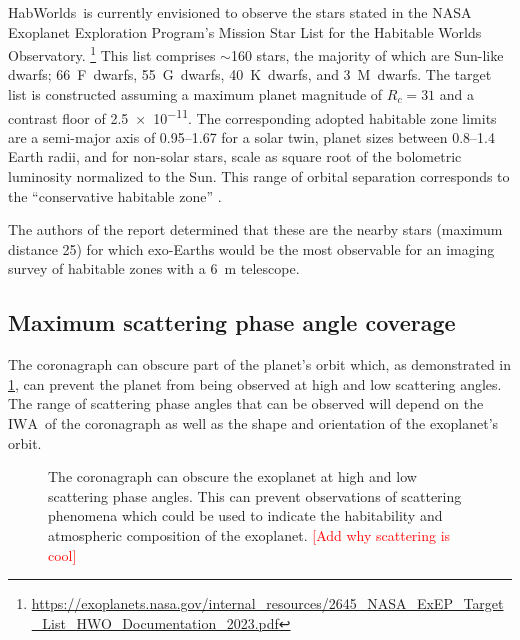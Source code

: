 \documentclass[
    usenatbib,
]{mnras}
\newcommand{\todo}[1]{\textcolor{red}{[#1]}}
\newcommand{\IWA}{\ensuremath{\mathrm{IWA}}}
\newcommand{\hwo}{HabWorlds}
\begin{document}
\hwo\ is currently envisioned to observe the stars stated in the NASA Exoplanet Exploration Program's Mission Star List for the Habitable Worlds Observatory.%
\footnote{\url{https://exoplanets.nasa.gov/internal_resources/2645_NASA_ExEP_Target_List_HWO_Documentation_2023.pdf}}
%
This list comprises $\sim$160 stars, the majority of which are Sun-like dwarfs; 66~F~dwarfs, 55~G~dwarfs, 40~K~dwarfs, and 3~M~dwarfs.
%
The target list is constructed assuming a maximum planet magnitude of $R_c = 31$ and a contrast floor of \num{2.5e-11}. 
The corresponding adopted habitable zone limits are a semi-major axis of \SIrange{0.95}{1.67}{\au} for a solar twin, planet sizes between \SIrange{0.8}{1.4}{} Earth radii, and for non-solar stars, scale as square root of the bolometric luminosity normalized to the Sun. 
%
This range of orbital separation corresponds to the \enquote{conservative habitable zone} \citep{kasting93, kopparapu13}.

The authors of the report determined that these are the nearby stars (maximum distance \SI{25}{\parsec}) for which exo-Earths would be the most observable for an imaging survey of habitable zones with a \SI{6}{\meter} telescope.


\subsection{Maximum scattering phase angle coverage}
\label{sec:Delta_phi}

The coronagraph can obscure part of the planet's orbit which, as demonstrated in \cref{fig:annotated-orbit}, can prevent the planet from being observed at high and low scattering angles. 
%
The range of scattering phase angles that can be observed will depend on the \IWA\ of the coronagraph as well as the shape and orientation of the exoplanet's orbit.

\begin{figure}
    \centering
    
    \caption{
        The coronagraph can obscure the exoplanet at high and low scattering phase angles. This can prevent observations of scattering phenomena which could be used to indicate the habitability and atmospheric composition of the exoplanet. \todo{Add why scattering is cool} 
    }
    \label{fig:annotated-orbit}
\end{figure}
\end{document}

